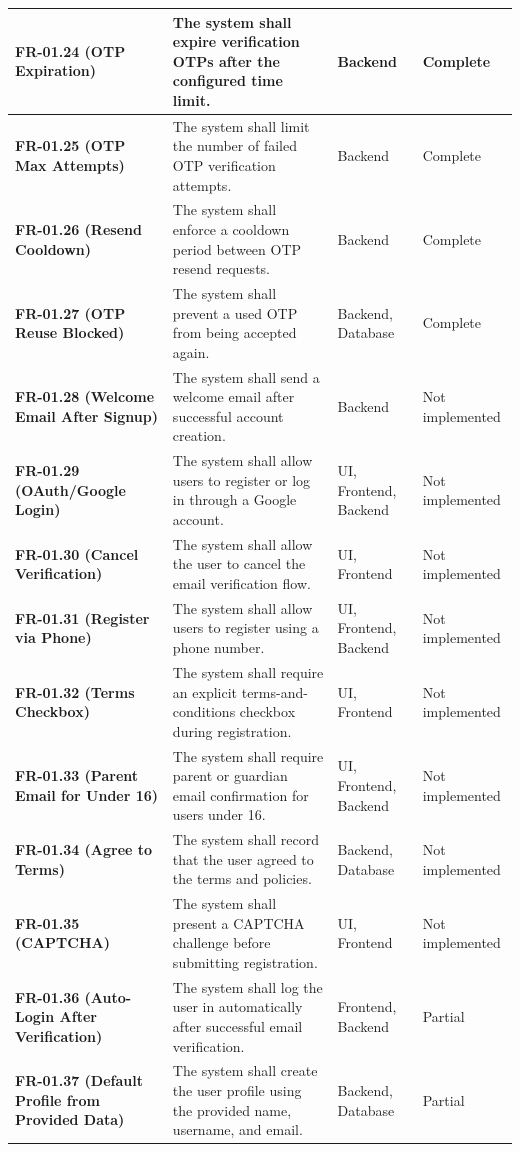 \documentclass[12pt]{article}
\begin{document}
\begin{longtable}{|>{\raggedright\arraybackslash}p{}|>{\raggedright\arraybackslash}p{}|>{\raggedright\arraybackslash}p{}|>{\raggedright\arraybackslash}p{}|}
\textbf{FR-01.24 (OTP Expiration)} & The system shall expire verification OTPs after the configured time limit. & Backend & Complete \\ \hline
\textbf{FR-01.25 (OTP Max Attempts)} & The system shall limit the number of failed OTP verification attempts. & Backend & Complete \\ \hline
\textbf{FR-01.26 (Resend Cooldown)} & The system shall enforce a cooldown period between OTP resend requests. & Backend & Complete \\ \hline
\textbf{FR-01.27 (OTP Reuse Blocked)} & The system shall prevent a used OTP from being accepted again. & Backend, Database & Complete \\ \hline
\textbf{FR-01.28 (Welcome Email After Signup)} & The system shall send a welcome email after successful account creation. & Backend & Not implemented \\ \hline
\textbf{FR-01.29 (OAuth/Google Login)} & The system shall allow users to register or log in through a Google account. & UI, Frontend, Backend & Not implemented \\ \hline
\textbf{FR-01.30 (Cancel Verification)} & The system shall allow the user to cancel the email verification flow. & UI, Frontend & Not implemented \\ \hline
\textbf{FR-01.31 (Register via Phone)} & The system shall allow users to register using a phone number. & UI, Frontend, Backend & Not implemented \\ \hline
\textbf{FR-01.32 (Terms Checkbox)} & The system shall require an explicit terms-and-conditions checkbox during registration. & UI, Frontend & Not implemented \\ \hline
\textbf{FR-01.33 (Parent Email for Under 16)} & The system shall require parent or guardian email confirmation for users under 16. & UI, Frontend, Backend & Not implemented \\ \hline
\textbf{FR-01.34 (Agree to Terms)} & The system shall record that the user agreed to the terms and policies. & Backend, Database & Not implemented \\ \hline
\textbf{FR-01.35 (CAPTCHA)} & The system shall present a CAPTCHA challenge before submitting registration. & UI, Frontend & Not implemented \\ \hline
\textbf{FR-01.36 (Auto-Login After Verification)} & The system shall log the user in automatically after successful email verification. & Frontend, Backend & Partial \\ \hline
\textbf{FR-01.37 (Default Profile from Provided Data)} & The system shall create the user profile using the provided name, username, and email. & Backend, Database & Partial \\ \hline

\end{longtable}
\end{document}
